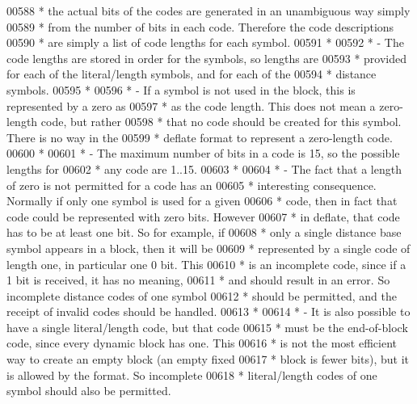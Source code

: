 \begin{DoxyCode}
00588 \textcolor{comment}{ *   the actual bits of the codes are generated in an unambiguous way simply}
00589 \textcolor{comment}{ *   from the number of bits in each code.  Therefore the code descriptions}
00590 \textcolor{comment}{ *   are simply a list of code lengths for each symbol.}
00591 \textcolor{comment}{ *}
00592 \textcolor{comment}{ * - The code lengths are stored in order for the symbols, so lengths are}
00593 \textcolor{comment}{ *   provided for each of the literal/length symbols, and for each of the}
00594 \textcolor{comment}{ *   distance symbols.}
00595 \textcolor{comment}{ *}
00596 \textcolor{comment}{ * - If a symbol is not used in the block, this is represented by a zero as}
00597 \textcolor{comment}{ *   as the code length.  This does not mean a zero-length code, but rather}
00598 \textcolor{comment}{ *   that no code should be created for this symbol.  There is no way in the}
00599 \textcolor{comment}{ *   deflate format to represent a zero-length code.}
00600 \textcolor{comment}{ *}
00601 \textcolor{comment}{ * - The maximum number of bits in a code is 15, so the possible lengths for}
00602 \textcolor{comment}{ *   any code are 1..15.}
00603 \textcolor{comment}{ *}
00604 \textcolor{comment}{ * - The fact that a length of zero is not permitted for a code has an}
00605 \textcolor{comment}{ *   interesting consequence.  Normally if only one symbol is used for a given}
00606 \textcolor{comment}{ *   code, then in fact that code could be represented with zero bits.  However}
00607 \textcolor{comment}{ *   in deflate, that code has to be at least one bit.  So for example, if}
00608 \textcolor{comment}{ *   only a single distance base symbol appears in a block, then it will be}
00609 \textcolor{comment}{ *   represented by a single code of length one, in particular one 0 bit.  This}
00610 \textcolor{comment}{ *   is an incomplete code, since if a 1 bit is received, it has no meaning,}
00611 \textcolor{comment}{ *   and should result in an error.  So incomplete distance codes of one symbol}
00612 \textcolor{comment}{ *   should be permitted, and the receipt of invalid codes should be handled.}
00613 \textcolor{comment}{ *}
00614 \textcolor{comment}{ * - It is also possible to have a single literal/length code, but that code}
00615 \textcolor{comment}{ *   must be the end-of-block code, since every dynamic block has one.  This}
00616 \textcolor{comment}{ *   is not the most efficient way to create an empty block (an empty fixed}
00617 \textcolor{comment}{ *   block is fewer bits), but it is allowed by the format.  So incomplete}
00618 \textcolor{comment}{ *   literal/length codes of one symbol should also be permitted.}

\end{DoxyCode}
